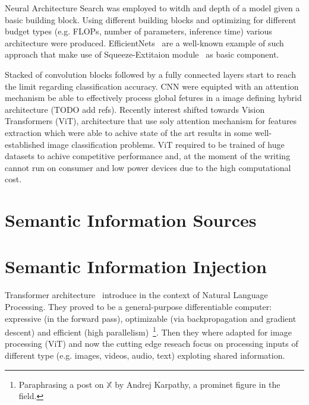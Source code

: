 Neural Architecture Search was employed to witdh and depth of a model given a
basic building block. Using different building blocks and optimizing for
different budget types (e.g. FLOPs, number of parameters, inference time)
various architecture were produced. EfficientNets~\cite{EfficientnetRTanM2019,
Efficientnetv2TanM2021} are a well-known example of such approach that make use
of Squeeze-Extitaion module~\cite{SqueezeAndExcHuJi2017} as basic component.

Stacked of convolution blocks followed by a fully connected layers start to
reach the limit regarding classification accuracy. CNN were equipted with an
attention mechanism be able to effectively process global fetures in a image
defining hybrid architecture (TODO add refs). Recently interest shifted towards
Vision Transformers (ViT), architecture that use soly attention mechanism for
features extraction which were able to achive state of the art results in some
well-established image classification problems. ViT required to be trained of
huge datasets to achive competitive performance and, at the moment of the
writing cannot run on consumer and low power devices due to the high
computational cost.


\section{Semantic Information Sources}
\label{sec:semantic-information-sources}



\section{Semantic Information Injection}
\label{sec:semantic-information-injection}


Transformer architecture~\cite{AttentionIsAlVaswan2017} introduce in the context
of Natural Language Processing. They proved to be a general-purpose
differentiable computer: expressive (in the forward pass), optimizable (via
backpropagation and gradient descent) and efficient (high
parallelism)~\footnote{Paraphrasing a post on $\mathbb{X}$ by Andrej Karpathy,
a prominet figure in the field.}. Then they where adapted for image processing
(ViT) and now the cutting edge reseach focus on processing inputs of different
type (e.g. images, videos, audio, text) exploting shared information.

